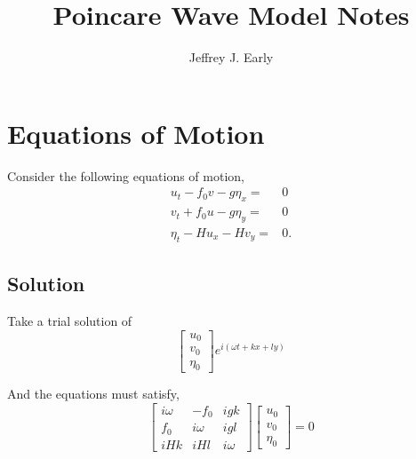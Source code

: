 \documentclass[11pt]{article}
\title{Poincare Wave Model Notes}
\author{Jeffrey J. Early}
\begin{document}
\maketitle

%
%
\section{Equations of Motion}
%
%



Consider the following equations of motion,
\begin{align}
u_t  -f_0 v - g\eta_x =& 0 \\
v_t + f_0 u - g\eta_y =& 0 \\
\eta_t - H u_x - H v_y =&0.
\end{align}

%
\subsection{Solution}
%

Take a trial solution of
\begin{equation}
\left[\begin{array}{c}u_0 \\v_0 \\ \eta_0\end{array}\right]
e^{i(\omega t + kx + ly)}
\end{equation}

And the equations must satisfy,
\begin{equation}
\left[\begin{array}{ccc}
i\omega & -f_0 & igk \\
 f_0  & i\omega  & igl \\
i H k & i H l & i\omega
\end{array}\right]
\left[\begin{array}{c}u_0 \\v_0 \\ \eta_0\end{array}\right]
=0
\end{equation}
\end{document}
